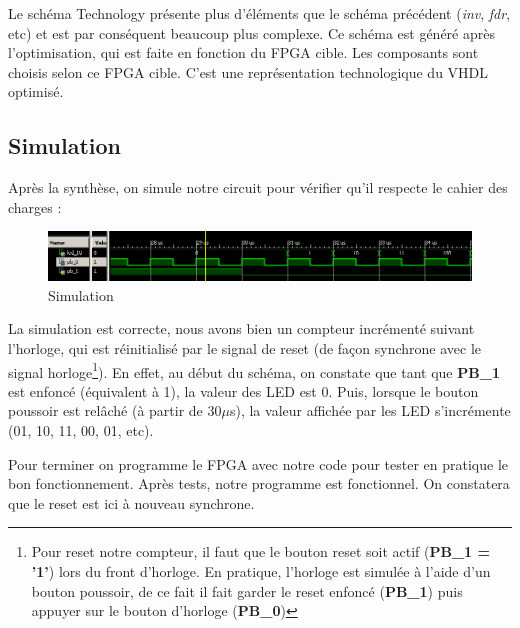 Le schéma \og Technology\fg{} présente plus d'éléments que le schéma précédent (\textit{inv}, \textit{fdr}, etc) et est par conséquent beaucoup plus complexe. Ce schéma est généré après l'optimisation, qui est faite en fonction du FPGA cible. Les composants sont choisis selon ce FPGA cible. C'est une représentation technologique du VHDL optimisé.

\subsection{Simulation}

Après la synthèse, on simule notre circuit pour vérifier qu'il respecte le cahier des charges :

\begin{figure}[!h]
   \centering\includegraphics[width=\textwidth]{files/tp2_1/simulateur.png}
   \caption{Simulation}
\end{figure}

La simulation est correcte, nous avons bien un compteur incrémenté suivant l'horloge, qui est réinitialisé par le signal de reset (de façon synchrone avec le signal horloge\footnote{Pour reset notre compteur, il faut que le bouton reset soit actif (\textbf{PB\_1 = '1'}) lors du front d'horloge. En pratique, l'horloge est simulée à l'aide d'un bouton poussoir, de ce fait il fait garder le reset enfoncé (\textbf{PB\_1}) puis appuyer sur le bouton d'horloge (\textbf{PB\_0})}). En effet, au début du schéma, on constate que tant que \textbf{PB\_1} est \og enfoncé\fg{} (équivalent à 1), la valeur des LED est 0. Puis, lorsque le bouton poussoir est relâché (à partir de 30$\mu$s), la valeur affichée par les LED s'incrémente (01, 10, 11, 00, 01, etc).

\bigskip

Pour terminer on programme le FPGA avec notre code pour tester en pratique le bon fonctionnement. Après tests, notre programme est fonctionnel. On constatera que le reset est ici à nouveau synchrone.

\newpage